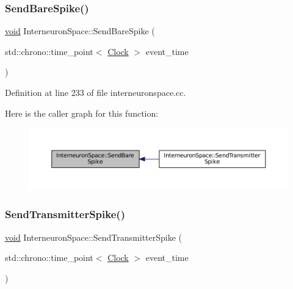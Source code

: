 \subsubsection{\texorpdfstring{Send\+Bare\+Spike()}{SendBareSpike()}}
{\footnotesize\ttfamily \mbox{\hyperlink{glad_8h_a950fc91edb4504f62f1c577bf4727c29}{void}} Interneuron\+Space\+::\+Send\+Bare\+Spike (\begin{DoxyParamCaption}\item[{std\+::chrono\+::time\+\_\+point$<$ \mbox{\hyperlink{universe_8h_a0ef8d951d1ca5ab3cfaf7ab4c7a6fd80}{Clock}} $>$}]{event\+\_\+time }\end{DoxyParamCaption})}



Definition at line 233 of file interneuronspace.\+cc.

Here is the caller graph for this function\+:\nopagebreak
\begin{figure}[H]
\begin{center}
\leavevmode
\includegraphics[width=350pt]{class_interneuron_space_ab56b0336c9e53f7b448e9d35e617e8c0_icgraph}
\end{center}
\end{figure}
\mbox{\label{class_interneuron_space_a0a24da715aecafd4072d596fc271666f}} 
\subsubsection{\texorpdfstring{Send\+Transmitter\+Spike()}{SendTransmitterSpike()}}
{\footnotesize\ttfamily \mbox{\hyperlink{glad_8h_a950fc91edb4504f62f1c577bf4727c29}{void}} Interneuron\+Space\+::\+Send\+Transmitter\+Spike (\begin{DoxyParamCaption}\item[{std\+::chrono\+::time\+\_\+point$<$ \mbox{\hyperlink{universe_8h_a0ef8d951d1ca5ab3cfaf7ab4c7a6fd80}{Clock}} $>$}]{event\+\_\+time }\end{DoxyParamCaption})}



